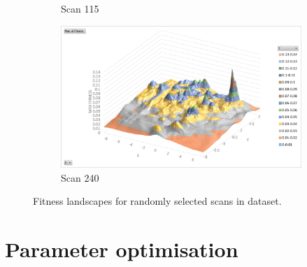 \documentclass[authoryearcitations]{UoYCSproject}
\begin{document}
\begin{figure}[ht]
\begin{subfigure}[b]{0.475\textwidth}
            {{\small Scan 115}}    
        \end{subfigure}
        \quad
        \begin{subfigure}[b]{0.475\textwidth}   
            \centering 
            \includegraphics[width=\textwidth]{images/landscape240.png}
            {{\small Scan 240}}    
        \end{subfigure}
        \caption{Fitness landscapes for randomly selected scans in dataset.}
        \label{fig:landscapes}
\end{figure}

\section{Parameter optimisation}
\end{document}
